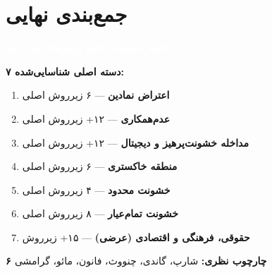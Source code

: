 \documentclass[a4paper,12pt]{article}
\begin{document}

\newpage

\section*{\textcolor{purpleLight}{\faBullseye} جمع‌بندی نهایی}

\begin{herobox}

\begin{center}
{\Large\bfseries\textcolor{white}{خلاصه دانشنامه جامع روش‌های مبارزاتی}}
\end{center}

\vspace{12pt}

\textbf{\textcolor{purpleLight}{۷ دسته اصلی شناسایی‌شده:}}

\vspace{8pt}

\begin{enumerate}[label=\textcolor{purpleLight}{\arabic*.}, leftmargin=20pt]
  \item \textcolor{greenPrimary}{\textbf{اعتراض نمادین}} — ۶ زیرروش اصلی
  \item \textcolor{bluePrimary}{\textbf{عدم‌همکاری}} — ۱۲+ زیرروش اصلی
  \item \textcolor{purplePrimary}{\textbf{مداخله خشونت‌پرهیز و دیجیتال}} — ۱۲+ زیرروش اصلی
  \item \textcolor{yellowDark}{\textbf{منطقه خاکستری}} — ۶ زیرروش اصلی
  \item \textcolor{orangePrimary}{\textbf{خشونت محدود}} — ۴ زیرروش اصلی
  \item \textcolor{redPrimary}{\textbf{خشونت تمام‌عیار}} — ۸ زیرروش اصلی
  \item \textcolor{pinkPrimary}{\textbf{حقوقی، فرهنگی و اقتصادی (عرضی)}} — ۱۵+ زیرروش
\end{enumerate}

\vspace{12pt}

\textbf{\textcolor{purpleLight}{۶ چارچوب نظری:}} شارپ، گاندی، چنووث، فانون، مائو، گرامشی

\vspace{12pt}

\end{herobox}

\vspace{12pt}
\end{document}
